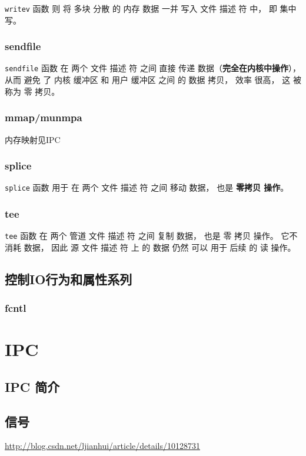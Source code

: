 \documentclass[UTF8,a4paper,8pt]{ctexbook}
\begin{document}
				\verb|writev| 函数 则 将 多块 分散 的 内存 数据 一并 写入 文件 描述 符 中， 即 集中 写。
				
			\subsubsection{sendfile}
				\verb|sendfile| 函数 在 两个 文件 描述 符 之间 直接 传递 数据（\textbf{完全在内核中操作}）， 从而 避免 了 内核 缓冲区 和 用户 缓冲区 之间 的 数据 拷贝， 效率 很高， 这 被称为 零 拷贝。
			
			\subsubsection{mmap/munmpa}
				内存映射见IPC
				
			\subsubsection{splice}
				\verb|splice| 函数 用于 在 两个 文件 描述 符 之间 移动 数据， 也是 \textbf{零拷贝 操作}。
				
			\subsubsection{tee}
				\verb|tee| 函数 在 两个 管道 文件 描述 符 之间 复制 数据， 也是 零 拷贝 操作。 它不 消耗 数据， 因此 源 文件 描述 符 上 的 数据 仍然 可以 用于 后续 的 读 操作。
			
		\subsection{控制IO行为和属性系列}
			\subsubsection{fcntl}
	
	\section{IPC}
		\subsection{IPC 简介}
			
		\subsection{信号}
			\url{http://blog.csdn.net/ljianhui/article/details/10128731}
\end{document}
